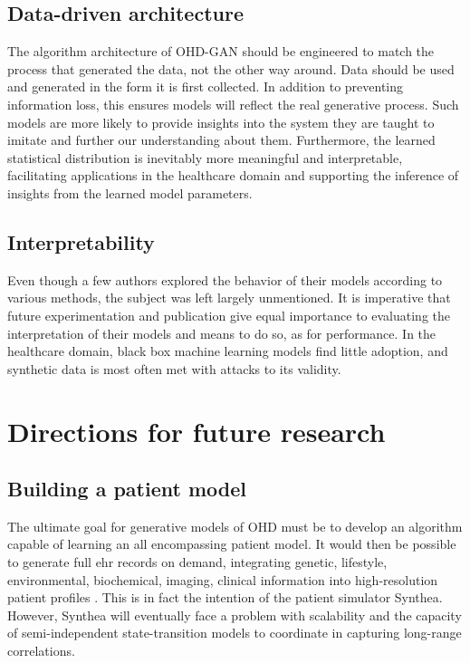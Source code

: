 \subsection{Data-driven architecture}\label{sec:archi}
The algorithm architecture of OHD-GAN should be engineered to match the process that generated the data, not the other way around. Data should be used and generated in the form it is first collected. In addition to preventing information loss, this ensures models will reflect the real generative process. Such models are more likely to provide insights into the system they are taught to imitate and further our understanding about them. Furthermore, the learned statistical distribution is inevitably more meaningful and interpretable, facilitating applications in the healthcare domain and supporting the inference of insights from the learned model parameters.
\subsection{Interpretability}
Even though a few authors explored the behavior of their models according to various methods, the subject was left largely unmentioned. It is imperative that future experimentation and publication give equal importance to evaluating the interpretation of their models and means to do so, as for performance. In the healthcare domain, black box machine learning models find little adoption, and synthetic data is most often met with attacks to its validity.

\section{Directions for future research}
\subsection{Building a patient model}
The ultimate goal for generative models of OHD must be to develop an algorithm capable of learning an all encompassing patient model. It would then be possible to generate full \gls{ehr} records on demand, integrating genetic, lifestyle, environmental, biochemical, imaging, clinical information into high-resolution patient profiles \cite{Capobianco2020}. This is in fact the intention of the patient simulator Synthea. However, Synthea will eventually face a problem with scalability and the capacity of semi-independent state-transition models to coordinate in capturing long-range correlations.\par

